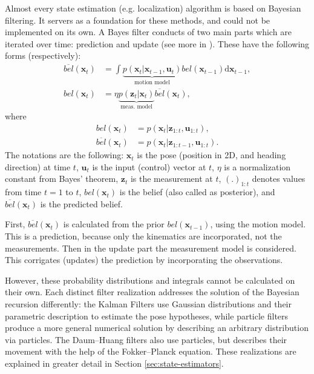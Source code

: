 Almost every state estimation (e.g. localization) algorithm is based on Bayesian filtering.
It servers as a foundation for these methods, and could not be implemented on its own.
A Bayes filter conducts of two main parts which are iterated over time: prediction and update (see more in \cite{Thrun2005}).
These have the following forms (respectively):
\begin{align}
    \overline{bel}(\mathbf{x}_t) & = \int \underbrace{p(\mathbf{x}_t | \mathbf{x}_{t-1},\mathbf{u}_t)}_{\text{motion model}}bel(\mathbf{x}_{t-1})\mathrm{d}\mathbf{x}_{t-1}, \label{eq:bayes-predict} \\
    bel(\mathbf{x}_t)            & = \eta \underbrace{p(\mathbf{\mathbf{z}}_t | \mathbf{x}_t)}_{\text{meas. model}}\overline{bel}(\mathbf{x}_t),
\end{align}
where
\begin{align}\label{key}
    bel(\mathbf{x}_t)            & = p(\mathbf{x}_t|\mathbf{z}_{1:t},\mathbf{u}_{1:t}),                      \\
    \overline{bel}(\mathbf{x}_t) & = p(\mathbf{x}_t|\mathbf{z}_{1:t-1},\mathbf{u}_{1:t}) \label{eq:predbel}.
\end{align}
The notations are the following: $\mathbf{x}_t$ is the pose (position in 2D, and heading direction) at time $t$,
$\mathbf{u}_t$ is the input (control) vector at $t$, $\eta$ is a normalization constant from  Bayes' theorem,
$\mathbf{z}_t$ is the measurement at $t$, $(.)_{1:t}$ denotes values from time $t = 1$ to $t$,
$bel(\mathbf{x}_t)$ is the belief (also called as posterior), and  $\overline{bel}(\mathbf{x}_t)$ is the predicted belief.

First, $\overline{bel}(\mathbf{x}_t)$ is calculated from the prior $bel(\mathbf{x}_{t-1})$, using the motion model.
This is a prediction, because only the kinematics are incorporated, not the measurements.
Then in the update part the measurement model is considered.
This corrigates (updates) the prediction by incorporating the observations.

However, these probability distributions and integrals cannot be calculated on their own.
Each distinct filter realization addresses the solution of the Bayesian recursion differently:
the Kalman Filters use Gaussian distributions and their parametric description to estimate the pose hypotheses,
while particle filters produce a more general numerical solution by describing an arbitrary distribution via particles.
The Daum--Huang filters also use particles, but describes their movement with the help of the Fokker--Planck equation.
These realizations are explained in greater detail in Section \ref{sec:state-estimators}.

